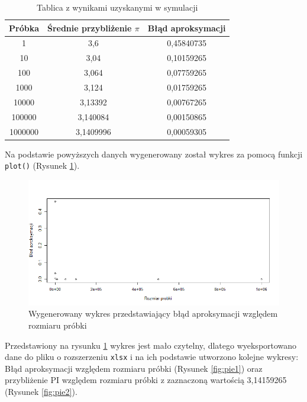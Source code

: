 \documentclass[a4paper,11pt,titlepage]{article}
\begin{document}
\begin{table}[h!]
\centering
\begin{tabular}{ |c|c|c| } 
 \hline
 Próbka & Średnie przybliżenie $\pi$ & Błąd aproksymacji \\
 \hline
 1	& 3,6 &	0,45840735 \\
 10	& 3,04 &	0,10159265 \\
 100	& 	3,064 &	0,07759265 \\
 1000	& 3,124 &	0,01759265 \\
 10000	& 3,13392 &	0,00767265 \\
 100000	& 	3,140084 &	0,00150865 \\
 1000000	& 3,1409996 &	0,00059305 \\
 \hline
\end{tabular}
\caption{Tablica z wynikami uzyskanymi w symulacji}
\label{tab:res}
\end{table}

Na podstawie powyższych danych wygenerowany został wykres za pomocą funkcji \verb|plot()| (Rysunek \ref{fig:pi10}). 

\begin{figure}[H]
\centering
\includegraphics[width=1\columnwidth]{img/pi10.PNG}
\caption{Wygenerowany wykres przedstawiający błąd aproksymacji względem rozmiaru próbki}
\label{fig:pi10}
\end{figure}

Przedstawiony na rysunku \ref{fig:pi10} wykres jest mało czytelny, dlatego wyeksportowano dane do pliku o rozszerzeniu \verb|xlsx| i na ich podstawie utworzono kolejne wykresy: Błąd aproksymacji względem rozmiaru próbki (Rysunek \ref{fig:pie1}) oraz przybliżenie PI względem rozmiaru próbki z zaznaczoną wartością 3,14159265 (Rysunek \ref{fig:pie2}).
\end{document}

